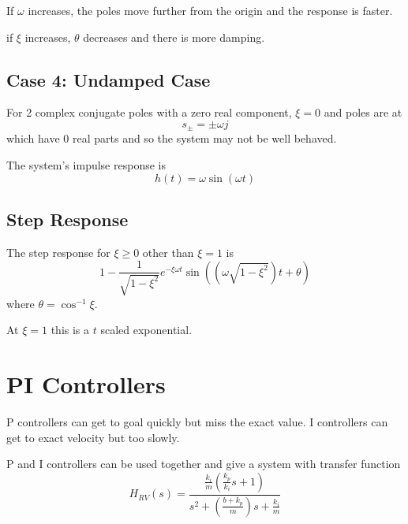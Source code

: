 \documentclass[11pt]{article}
\begin{document}
If \(\omega\) increases, the poles move further from the origin and the response
is faster.

if \(\xi\) increases, \(\theta\) decreases and there is more damping.
\subsection{Case 4: Undamped Case}
\label{sec:org6339caf}
For 2 complex conjugate poles with a zero real component, \(\xi = 0\) and poles are at
$$
s_{\pm} = \pm \omega j
$$
which have 0 real parts and so the system may not be well behaved.

The system's impulse response is
$$
h(t) = \omega \sin(\omega t)
$$
\subsection{Step Response}
\label{sec:org77ba733}
The step response for \(\xi \ge 0\) other than \(\xi = 1\) is
$$
1 - \frac{1}{\sqrt{1 - \xi^{2}}} e^{-\xi \omega t} \sin \left(
(\omega \sqrt{1 - \xi^{2}}) t + \theta
\right)
$$
where \(\theta = \cos^{-1} \xi\).

At \(\xi = 1\) this is a \(t\) scaled exponential.
\section{PI Controllers}
\label{sec:org97294b8}
P controllers can get to goal quickly but miss the exact value.
I controllers can get to exact velocity but too slowly.

P and I controllers can be used together and give a system with
transfer function
$$
H_{RV}(s) = \frac{\frac{k_{i}}{m} \left( \frac{k_{p}}{k_{i}} s + 1 \right)}{s^{2} +
\left( \frac{b + k_{p}}{m} \right) s + \frac{k_{i}}{m}}
$$
\end{document}
